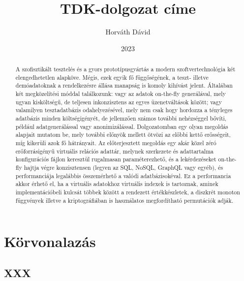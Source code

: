 \documentclass[
    parspace, %
    noindent, %
]{elteiktdk}[2023/04/10]
\title{TDK-dolgozat címe}
\date{2023}
\author{Horváth Dávid}
\affiliation{PhD, Mesteroktató}
\begin{document}

\listoftodos
\cleardoublepage

\makecover
\cleardoublepage

\maketitle

\tableofcontents
\cleardoublepage


\begin{abstract}
A szofisztikált tesztelés és a gyors prototípusgyártás
a modern szoftvertechnológia két elengedhetetlen alapköve.
Mégis, ezek egyik fő függőségének, a teszt- illetve demóadatoknak
a rendelkezésre állása manapság is komoly kihívást jelent.
Általában két megközelítési móddal találkozunk:
vagy az adatok on-the-fly generálával, mely ugyan kisköltségű,
de teljesen inkonzisztens az egyes üzenetváltások között;
vagy valamilyen tesztadatbázis odahelyezésével,
mely nem csak hogy hordozza a tényleges adatbázis minden költségigényét,
de jellemzően számos további nehézséggel bővíti, például adatgenerálással vagy anonimizálással.
Dolgozatomban egy olyan megoldás alapjait mutatom be,
mely további előnyök mellett ötvözi az előbbi kettő erősségeit,
míg kikerüli azok fő hátrányait.
Az előterjesztett megoldás egy akár közel zéró erőforrásigényű virtuális relációs adattár,
melynek szerkezete és adattartalma konfigurációs fájlon keresztül rugalmasan paraméterezhető,
és a lekérdezéseket on-the-fly hajtja végre konzisztensen
(legyen az SQL, NoSQL, GraphQL vagy egyéb),
és performanciája legalábbis összemérhető a valódi adatbázisokéval.
Ez a performancia akkor érhető el, ha a virtuális adatokhoz virtuális indexek is tartoznak,
aminek implementációbeli kulcsát többek között a rendezett értékkészletek,
a diszkrét monoton függvények
illetve a kriptográfiában is használatos megfordítható permutációk adják.
\end{abstract}


\chapter{Körvonalazás}

\section{XXX}
\end{document}
